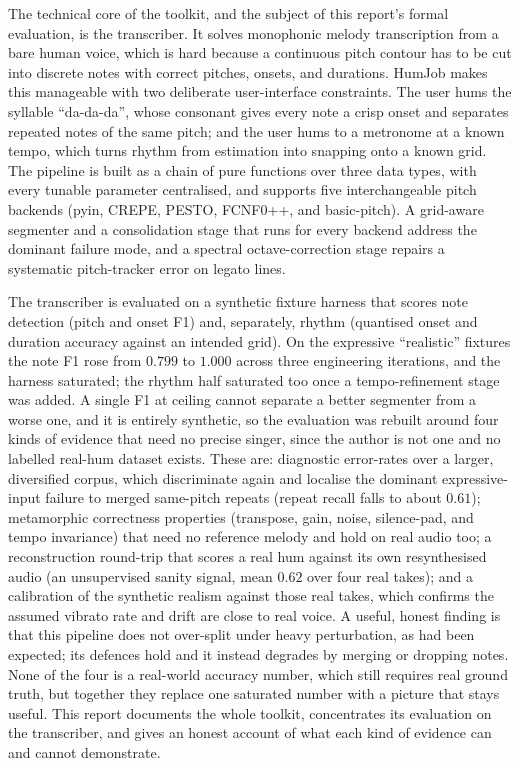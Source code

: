 \documentclass[12pt,a4paper]{article}
\begin{document}
The technical core of the toolkit, and the subject of this report's formal
evaluation, is the transcriber. It solves monophonic melody transcription from a
bare human voice, which is hard because a continuous pitch contour has to be cut
into discrete notes with correct pitches, onsets, and durations. HumJob makes
this manageable with two deliberate user-interface constraints. The user hums the
syllable ``da-da-da'', whose consonant gives every note a crisp onset and
separates repeated notes of the same pitch; and the user hums to a metronome at
a known tempo, which turns rhythm from estimation into snapping onto a known
grid. The pipeline is built as a chain of pure functions over three data types,
with every tunable parameter centralised, and supports five interchangeable
pitch backends (pyin, CREPE, PESTO, FCNF0++, and basic-pitch). A grid-aware
segmenter and a consolidation stage that runs for every backend address the dominant
failure mode, and a spectral octave-correction stage repairs a systematic
pitch-tracker error on legato lines.

The transcriber is evaluated on a synthetic fixture harness that scores note
detection (pitch and onset F1) and, separately, rhythm (quantised onset and
duration accuracy against an intended grid). On the expressive ``realistic''
fixtures the note F1 rose from $0.799$ to $1.000$ across three engineering
iterations, and the harness saturated; the rhythm half saturated too once a
tempo-refinement stage was added. A single F1 at ceiling cannot separate a better
segmenter from a worse one, and it is entirely synthetic, so the evaluation was
rebuilt around four kinds of evidence that need no precise singer, since the
author is not one and no labelled real-hum dataset exists. These are: diagnostic
error-rates over a larger, diversified corpus, which discriminate again and
localise the dominant expressive-input failure to merged same-pitch repeats
(repeat recall falls to about $0.61$); metamorphic correctness properties
(transpose, gain, noise, silence-pad, and tempo invariance) that need no reference
melody and hold on real audio too; a reconstruction round-trip that scores a real
hum against its own resynthesised audio (an unsupervised sanity signal, mean
$0.62$ over four real takes); and a calibration of the synthetic realism against
those real takes, which confirms the assumed vibrato rate and drift are close
to real voice. A useful, honest finding is that this pipeline does not
over-split under heavy perturbation, as had been expected; its defences hold and
it instead degrades by merging or dropping notes. None of the four is a
real-world accuracy number, which still requires real ground truth, but together
they replace one saturated number with a picture that stays useful. This report
documents the whole toolkit, concentrates its evaluation on the transcriber, and
gives an honest account of what each kind of evidence can and cannot demonstrate.
\end{document}
